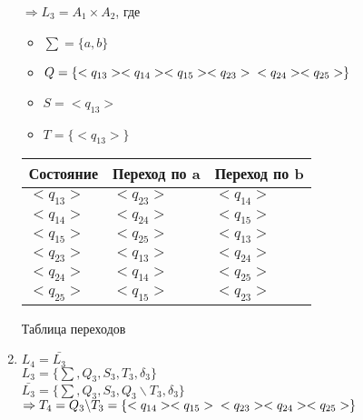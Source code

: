 \documentclass{article}
\begin{document}
\begin{enumerate}
            $\Rightarrow L_3 = A_1 \times A_2$, где
            \begin{itemize}
                \item $\sum = \{ a,b \}$ \\
                \item $Q = \{<q_{13}> <q_{14}> <q_{15}> <q_{23}> \\ <q_{24}> <q_{25}>\}$ \\
                \item $S = <q_{13}>$ \\
                \item $T = \{<q_{13}> \}$ \\
            \end{itemize}
        
            \begin{tabular} { | l | l | l | }
                \hline 
                Состояние & Переход по a & Переход по b \\ \hline
                $<q_{13}>$ & $<q_{23}>$ & $<q_{14}>$  \\ \hline
                $<q_{14}>$ & $<q_{24}>$ & $<q_{15}>$ \\ \hline
                $<q_{15}>$ & $<q_{25}>$ & $<q_{13}>$ \\ \hline
                $<q_{23}>$ & $<q_{13}>$ & $<q_{24}>$ \\ \hline
                $<q_{24}>$ & $<q_{14}>$ & $<q_{25}>$ \\ \hline
                $<q_{25}>$ & $<q_{15}>$ & $<q_{23}>$ \\ 
                \hline
            \end{tabular}

            \begin{center}
                Таблица переходов
            \end{center}

        \item $ L_4 = \bar{L_3}$ \\
        
            $L_3 = \{ \sum, Q_3, S_3, T_3, \delta_3  \}$ \\ 
            $\bar{L_3} = \{ \sum, Q_3, S_3, Q_3\backslash T_3, \delta_3  \}$ \\
            $\Rightarrow T_4 = Q_3 \backslash T_3 = \{<q_{14}> <q_{15}> \\ <q_{23}> <q_{24}> <q_{25}>\}$
        
            \begin{center}
            \end{center}        
            

\end{enumerate}
\end{document}
